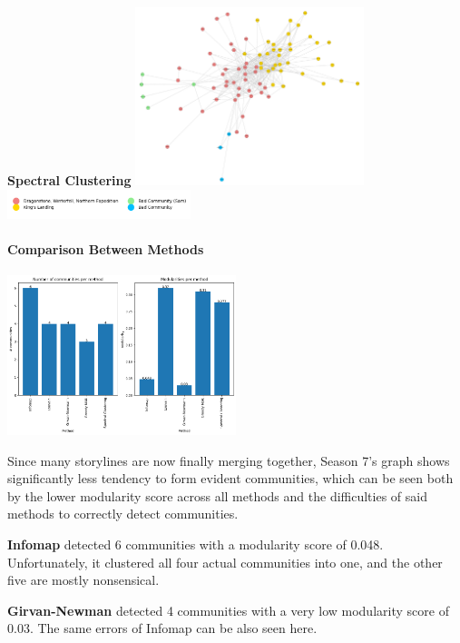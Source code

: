 \documentclass[10pt,twocolumn,letterpaper]{article}
\begin{document}
\begin{center}
    \textbf{Spectral Clustering}
    \includegraphics[width=0.5\textwidth]{img/s7/communities_sc.jpg}
    \includegraphics[width=0.4\textwidth]{img/s7/sc_legend.jpg}\\
    \caption{\small{$\#communities=4$, $modularity=0.277$}}
\end{center}

\paragraph{Comparison Between Methods}

\begin{center}
    \includegraphics[width=0.5\textwidth]{img/s7/communities_comparison.jpg}
\end{center}

Since many storylines are now finally merging together, Season 7's graph shows significantly less tendency to form evident communities, which can be seen both by the lower modularity score across all methods and the difficulties of said methods to correctly detect communities. 

\textbf{Infomap} detected 6 communities with a modularity score of 0.048. Unfortunately, it clustered all four actual communities into one, and the other five are mostly nonsensical. 

\textbf{Girvan-Newman} detected 4 communities with a very low modularity score of 0.03. The same errors of Infomap can be also seen here.
\end{document}
